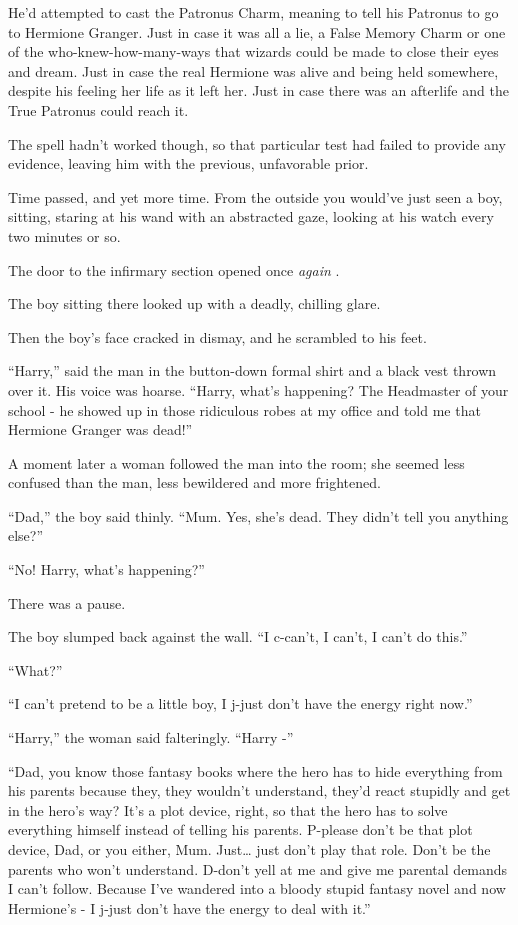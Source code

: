 He'd attempted to cast the Patronus Charm, meaning to tell his Patronus
to go to Hermione Granger. Just in case it was all a lie, a False Memory
Charm or one of the who-knew-how-many-ways that wizards could be made to
close their eyes and dream. Just in case the real Hermione was alive and
being held somewhere, despite his feeling her life as it left her. Just
in case there was an afterlife and the True Patronus could reach it.

The spell hadn't worked though, so that particular test had failed to
provide any evidence, leaving him with the previous, unfavorable prior.

Time passed, and yet more time. From the outside you would've just seen
a boy, sitting, staring at his wand with an abstracted gaze, looking at
his watch every two minutes or so.

The door to the infirmary section opened once \emph{again} .

The boy sitting there looked up with a deadly, chilling glare.

Then the boy's face cracked in dismay, and he scrambled to his feet.

``Harry,'' said the man in the button-down formal shirt and a black vest
thrown over it. His voice was hoarse. ``Harry, what's happening? The
Headmaster of your school - he showed up in those ridiculous robes at my
office and told me that Hermione Granger was dead!''

A moment later a woman followed the man into the room; she seemed less
confused than the man, less bewildered and more frightened.

``Dad,'' the boy said thinly. ``Mum. Yes, she's dead. They didn't tell
you anything else?''

``No! Harry, what's happening?''

There was a pause.

The boy slumped back against the wall. ``I c-can't, I can't, I can't do
this.''

``What?''

``I can't pretend to be a little boy, I j-just don't have the energy
right now.''

``Harry,'' the woman said falteringly. ``Harry -''

``Dad, you know those fantasy books where the hero has to hide
everything from his parents because they, they wouldn't understand,
they'd react stupidly and get in the hero's way? It's a plot device,
right, so that the hero has to solve everything himself instead of
telling his parents. P-please don't be that plot device, Dad, or you
either, Mum. Just\ldots{} just don't play that role. Don't be the
parents who won't understand. D-don't yell at me and give me parental
demands I can't follow. Because I've wandered into a bloody stupid
fantasy novel and now Hermione's - I j-just don't have the energy to
deal with it.''

